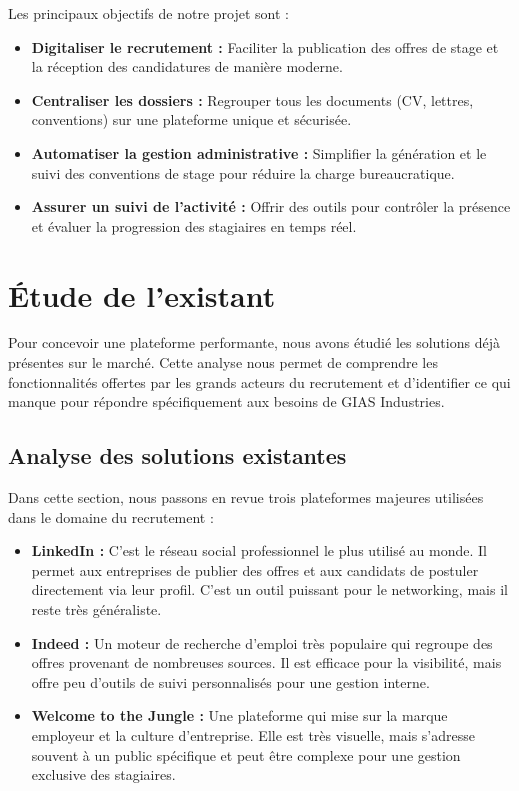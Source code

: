 Les principaux objectifs de notre projet sont :
\begin{itemize}
    \item \textbf{Digitaliser le recrutement :} Faciliter la publication des offres de stage et la réception des candidatures de manière moderne.
    \item \textbf{Centraliser les dossiers :} Regrouper tous les documents (CV, lettres, conventions) sur une plateforme unique et sécurisée.
    \item \textbf{Automatiser la gestion administrative :} Simplifier la génération et le suivi des conventions de stage pour réduire la charge bureaucratique.
    \item \textbf{Assurer un suivi de l'activité :} Offrir des outils pour contrôler la présence et évaluer la progression des stagiaires en temps réel.
\end{itemize}

\section{Étude de l'existant}
Pour concevoir une plateforme performante, nous avons étudié les solutions déjà présentes sur le marché. Cette analyse nous permet de comprendre les fonctionnalités offertes par les grands acteurs du recrutement et d'identifier ce qui manque pour répondre spécifiquement aux besoins de GIAS Industries.

\subsection{Analyse des solutions existantes}
Dans cette section, nous passons en revue trois plateformes majeures utilisées dans le domaine du recrutement :

\begin{itemize}
    \item \textbf{LinkedIn :} C'est le réseau social professionnel le plus utilisé au monde. Il permet aux entreprises de publier des offres et aux candidats de postuler directement via leur profil. C'est un outil puissant pour le networking, mais il reste très généraliste.
    \item \textbf{Indeed :} Un moteur de recherche d'emploi très populaire qui regroupe des offres provenant de nombreuses sources. Il est efficace pour la visibilité, mais offre peu d'outils de suivi personnalisés pour une gestion interne.
    \item \textbf{Welcome to the Jungle :} Une plateforme qui mise sur la marque employeur et la culture d'entreprise. Elle est très visuelle, mais s'adresse souvent à un public spécifique et peut être complexe pour une gestion exclusive des stagiaires.
\end{itemize}


